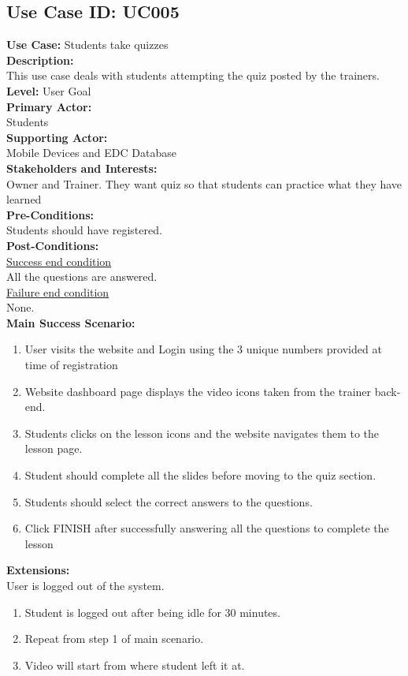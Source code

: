 \documentclass{report}
\begin{document}
\subsection{\textbf{Use Case ID:} UC005}
\textbf{Use Case:} Students take quizzes\\[0.3cm]
\textbf{Description:}\\
This use case deals with students attempting the quiz posted by the trainers.\\[0.3cm]
\textbf{Level:} User Goal\\[0.3cm]
\textbf{Primary Actor:}\\
Students\\[0.3cm]
\textbf{Supporting Actor:}\\
Mobile Devices and EDC Database\\[0.3cm]
\textbf{Stakeholders and Interests:}\\
Owner and Trainer. They want quiz so that students can practice what they have learned\\[0.3cm]
\textbf{Pre-Conditions:}\\
Students should have registered.\\[0.3cm]
\textbf{Post-Conditions:}\\
\underline{Success end condition}\\
All the questions are answered.\\[0.3cm]
\underline{Failure end condition}\\
None.\\[0.3cm]
\textbf{\large {Main Success Scenario:}}
\begin{enumerate}
    \item User visits the website and Login using the 3 unique numbers provided at time of registration
    \item Website dashboard page displays the video icons taken from the trainer back-end.
    \item Students clicks on the lesson icons and the website navigates them to the lesson page.
    \item Student should complete all the slides before moving to the quiz section.
    \item Students should select the correct answers to the questions.
    \item Click FINISH after successfully answering all the questions to complete the lesson
\end{enumerate}
\textbf{Extensions:}\\
User is logged out of the system.
\begin{enumerate}
    \item Student is logged out after being idle for 30 minutes.
    \item Repeat from step 1 of main scenario.
    \item Video will start from where student left it at.
\end{enumerate}
\end{document}
